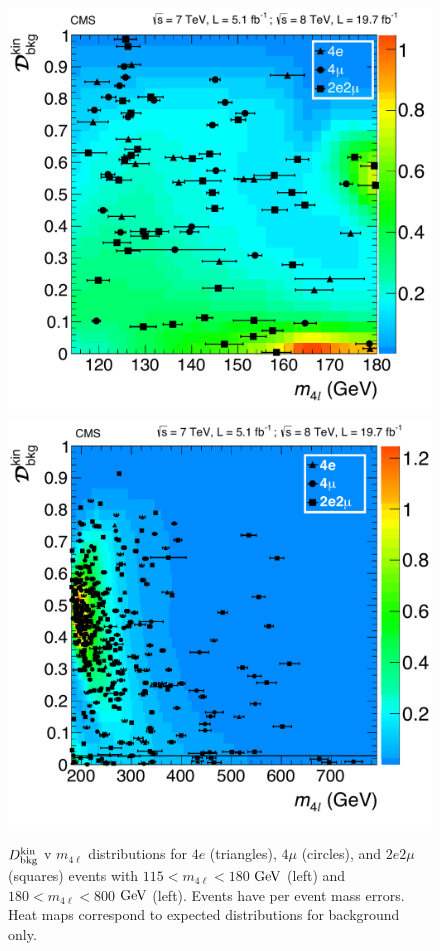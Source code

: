 \begin{figure}[htbp]
\begin{center}
\includegraphics[width=.45\linewidth]{HiggsDiscovery/figures/KD_vs_m4l_lowMass_Back.pdf}
\includegraphics[width=.45\linewidth]{HiggsDiscovery/figures/KD_vs_m4l_highMass_Back.pdf}
\caption[Observed $D_{\rm{bkg}}^{\rm{kin}}$ Distributions for $4\ell$ Events]{$D_{\rm{bkg}}^{\rm{kin}}$ v $m_{4\ell}$ distributions for $4e$ (triangles), $4\mu$ (circles), and $2e2\mu$ (squares) events with $115 < m_{4\ell} < 180$ $\rm{GeV}$ (left) and $180 < m_{4\ell} < 800$ $\rm{GeV}$ (left). Events have per event mass errors. Heat maps correspond to expected distributions for background only.}
\label{fig:Dbkg_2D_Results}
\end{center}
\end{figure}

